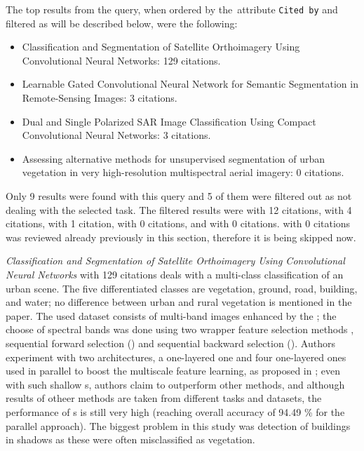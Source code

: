 \noindent The top results from the query, when ordered by the~attribute \verb|Cited by| and filtered as will be described below, were the following:

\begin{itemize}
	\item Classification and Segmentation of Satellite Orthoimagery Using Convolutional Neural Networks: 129 citations. \cite{cnn-satellite-orthoimagery}
	\item Learnable Gated Convolutional Neural Network for Semantic Segmentation in Remote-Sensing Images: 3 citations. \cite{gated-cnn-rs}
	\item Dual and Single Polarized SAR Image Classification Using Compact Convolutional Neural Networks: 3 citations. \cite{polarized-sar-cnn}
	\item Assessing alternative methods for unsupervised segmentation of urban vegetation in very high-resolution multispectral aerial imagery: 0 citations. \cite{urban-green-unsupervised-aerial}
\end{itemize}

\noindent Only 9 results were found with this query and 5 of them were filtered out as not dealing with the selected task. The filtered results were \cite{urban-green-trees-worldview} with 12 citations, \cite{cnn-urban-aerial} with 4 citations, \cite{urban-green-quantification} with 1 citation, \cite{dl-vegetation} with 0 citations, and \cite{tibet-ice-ml} with 0 citations. \cite{urban-green-unsupervised-aerial} with 0 citations was reviewed already previously in this section, therefore it is being skipped now.

\textit{Classification and Segmentation of Satellite Orthoimagery Using Convolutional Neural Networks} \cite{cnn-satellite-orthoimagery} with 129 citations deals with a multi-class classification of an urban scene. The five differentiated classes are vegetation, ground, road, building, and water; no difference between urban and rural vegetation is mentioned in the paper. The used dataset consists of multi-band images enhanced by the ; the choose of spectral bands was done using two wrapper feature selection methods \cite{wrapper-feature-selection}, sequential forward selection () and sequential backward selection (). Authors experiment with two  architectures, a one-layered one and four one-layered ones used in parallel to boost the multiscale feature learning, as proposed in \cite{multiscale-parallel-cnn}; even with such shallow s, authors claim to outperform other  methods, and although results of otheer methods are taken from different tasks and datasets, the performance of s is still very high (reaching overall accuracy of 94.49 \% for the parallel approach). The biggest problem in this study was detection of buildings in shadows as these were often misclassified as vegetation.

